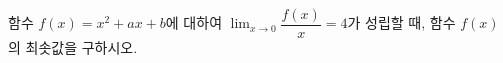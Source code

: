 함수 $f(x)=x^2+ax+b$에 대하여 $\displaystyle\lim_{x\to 0}\dfrac{f(x)}{x}=4$가 성립할 때, 함수 $f(x)$의 최솟값을 구하시오. 
